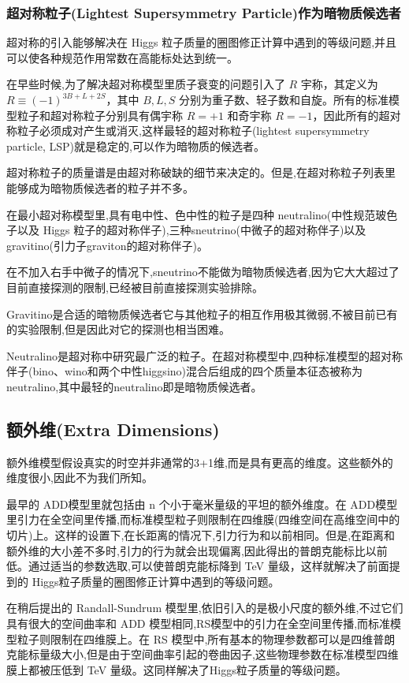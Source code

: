 \subsubsection{超对称粒子(Lightest Supersymmetry Particle)作为暗物质候选者}

超对称的引入能够解决在 Higgs 粒子质量的圈图修正计算中遇到的等级问题,并且可以使各种规范作用常数在高能标处达到统一。

在早些时候,为了解决超对称模型里质子衰变的问题引入了 $R$ 宇称，其定义为 $R\equiv (-1)^{3B+L+2S}$，其中 $B,L,S$ 分别为重子数、轻子数和自旋。所有的标准模型粒子和超对称粒子分别具有偶宇称 $R=+1$ 和奇宇称 $R=-1$，因此所有的超对称粒子必须成对产生或消灭,这样最轻的超对称粒子(lightest supersymmetry particle, LSP)就是稳定的,可以作为暗物质的候选者。

超对称粒子的质量谱是由超对称破缺的细节来决定的。但是,在超对称粒子列表里能够成为暗物质候选者的粒子并不多。

在最小超对称模型里,具有电中性、色中性的粒子是四种 neutralino(中性规范玻色子以及 Higgs 粒子的超对称伴子),三种sneutrino(中微子的超对称伴子)以及 gravitino(引力子graviton的超对称伴子)。

在不加入右手中微子的情况下,sneutrino不能做为暗物质候选者,因为它大大超过了目前直接探测的限制,已经被目前直接探测实验排除。

Gravitino是合适的暗物质候选者它与其他粒子的相互作用极其微弱,不被目前已有的实验限制,但是因此对它的探测也相当困难。

Neutralino是超对称中研究最广泛的粒子。在超对称模型中,四种标准模型的超对称伴子(bino、wino和两个中性higgsino)混合后组成的四个质量本征态被称为neutralino,其中最轻的neutralino即是暗物质候选者。

\subsection{额外维(Extra Dimensions)}

额外维模型假设真实的时空并非通常的3+1维,而是具有更高的维度。这些额外的维度很小,因此不为我们所知。

最早的 ADD模型里就包括由 n 个小于毫米量级的平坦的额外维度。在 ADD模型里引力在全空间里传播,而标准模型粒子则限制在四维膜(四维空间在高维空间中的切片)上。这样的设置下,在长距离的情况下,引力行为和以前相同。但是,在距离和额外维的大小差不多时,引力的行为就会出现偏离,因此得出的普朗克能标比以前低。通过适当的参数选取,可以使普朗克能标降到 TeV 量级，这样就解决了前面提到的 Higgs粒子质量的圈图修正计算中遇到的等级问题。

在稍后提出的 Randall-Sundrum 模型里,依旧引入的是极小尺度的额外维,不过它们具有很大的空间曲率和 ADD 模型相同,RS模型中的引力在全空间里传播,而标准模型粒子则限制在四维膜上。在 RS 模型中,所有基本的物理参数都可以是四维普朗克能标量级大小,但是由于空间曲率引起的卷曲因子,这些物理参数在标准模型四维膜上都被压低到 TeV 量级。这同样解决了Higgs粒子质量的等级问题。

